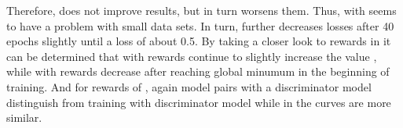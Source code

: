 Therefore, \origsampling does not improve results, but in turn worsens them.
Thus, \kbgan with \origsampling seems to have a problem with small data sets.
In turn, \ussoftmax further decreases losses after 40 epochs slightly until a loss of about 0.5.
By taking a closer look to rewards in  it can be determined that with \origsampling rewards continue to slightly increase the value , while with \ussoftmax rewards decrease after reaching global minumum in the beginning of training. 
And for rewards of \ussoftmax, again model pairs with a \transd discriminator model distinguish from training with \transe discriminator model while in \origsampling the curves are more similar.